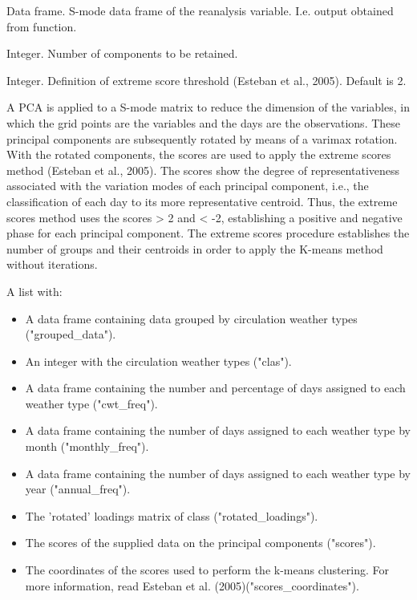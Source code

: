\documentclass[a4paper]{book}
\begin{document}
%
\begin{Arguments}
\begin{ldescription}
\item[\code{smode\_data}] Data frame. S-mode data frame of the reanalysis variable. I.e. output obtained from  function.

\item[\code{ncomp}] Integer. Number of components to be retained.

\item[\code{extreme\_scores}] Integer. Definition of extreme score threshold (Esteban et al., 2005). Default is 2.
\end{ldescription}
\end{Arguments}
%
\begin{Details}\relax
A PCA is applied to a S-mode matrix to reduce the dimension of the variables, in which the grid points are the variables and the days are the observations.
These principal components are subsequently rotated by means of a varimax rotation. With the rotated components, the scores are used to apply the extreme
scores method (Esteban et al., 2005). The scores show the degree of representativeness associated with the variation modes of each principal component, i.e.,
the classification of each day to its more representative centroid. Thus, the extreme scores method uses the scores > 2 and < -2, establishing a positive and
negative phase for each principal component. The extreme scores procedure establishes the number of groups and their centroids in order to apply the K-means
method without iterations.
\end{Details}
%
\begin{Value}
A list with: \begin{itemize}

\item A data frame containing data grouped by circulation weather types ("grouped\_data").
\item An integer with the circulation weather types ("clas").
\item A data frame containing the number and percentage of days assigned to each weather type ("cwt\_freq").
\item A data frame containing the number of days assigned to each weather type by month ("monthly\_freq").
\item A data frame containing the number of days assigned to each weather type by year ("annual\_freq").
\item The 'rotated' loadings matrix of class  ("rotated\_loadings").
\item The scores of the supplied data on the principal components ("scores").
\item The coordinates of the scores used to perform the k-means clustering. For more information, read Esteban et al. (2005)("scores\_coordinates").

\end{itemize}

\end{Value}
\end{document}
